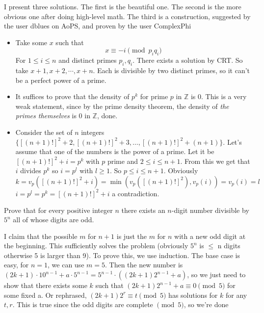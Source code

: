\documentclass[11pt]{scrartcl}
\begin{document}
\begin{soln}
  I present three solutions. The first is the beautiful one. The second is the more obvious one after doing high-level math. The third is a construction, suggested by the user dblues on AoPS, and proven by the user ComplexPhi
  \begin{itemize}
    \item Take some $x$ such that
      $$x\equiv -i\pmod{p_iq_i}$$
      For $1\le i\le n$ and distinct primes $p_i, q_i$. There exists a solution by CRT. So take $x+1, x+2, \cdots, x+n$.
      Each is divisible by two distinct primes, so it can't be a perfect power of a prime.
    \item It suffices to prove that the density of $p^k$ for prime $p$ in $\mathbb{Z}$ is $0$.
      This is a very weak statement, since by the prime density theorem, the density of \textit{the primes themselves} is $0$ in $\mathbb{Z}$, done.
    \item Consider the set of $n$ integers $\{ [(n+1)!]^2 + 2, [(n+1)!]^2 + 3, \ldots , [(n+1)!]^2 + (n+1) \}$. Let's assume that one of the numbers is the power of a prime.
      Let it be $[(n+1)!]^2+i=p^k$ with $p$ prime and $2\leq i\leq n+1$.
      From this we get that $i$ divides $p^k$ so $i=p^l$ with $l\geq 1$.
      So $p\leq i\leq n+1$. Obviously $k=v_p([(n+1)!]^2+i)=\min(v_p([(n+1)!]^2),v_p(i))=v_p(i)=l$
      $i=p^l=p^k=[(n+1)!]^2+i$ a contradiction.

  \end{itemize}
\end{soln}
\begin{example}
  [USAMO 2003]
  Prove that for every positive integer $n$ there exists an $n$-digit number divisible by $5^n$ all of whose digits are odd.
\end{example}
\begin{soln}
  I claim that the possible $m$ for $n+1$ is just the $m$ for $n$ with a new odd digit at the beginning. This sufficiently solves the problem (obviously $5^n$ is $\le$ n digits otherwise 5 is larger than 9).
  To prove this, we use induction. The base case is easy, for $n=1$, we can use $m=5$. Then the new number is $(2k+1)\cdot 10^{n-1}+a\cdot 5^{n-1}=5^{n-1}\cdot ((2k+1)2^{n-1}+a)$, so we just need to show that there exists some $k$ such that $(2k+1)2^{n-1}+a\equiv 0\pmod{5}$ for some fixed a.
  Or rephrased, $(2k+1)2^r\equiv t\pmod{5}$ has solutions for $k$ for any $t,r$. This is true since the odd digits are complete $\pmod{5}$, so we're done
\end{soln}
\end{document}
